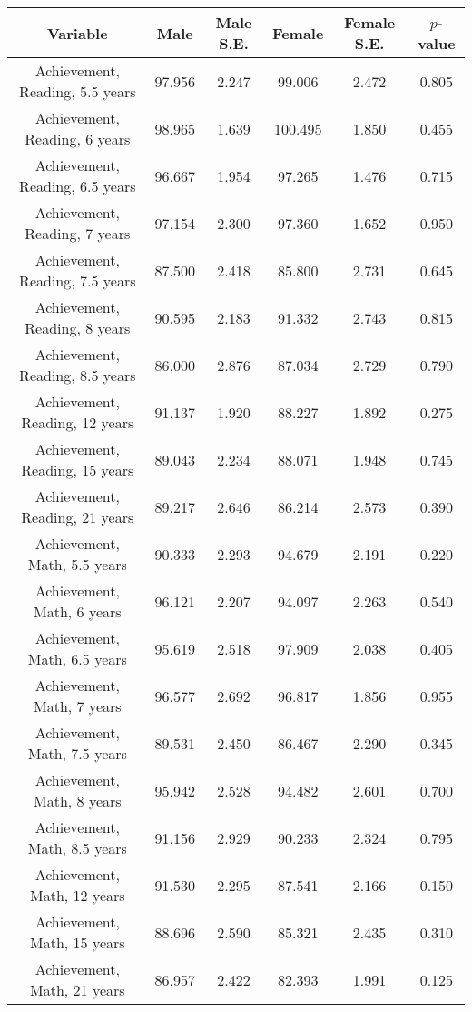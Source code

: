 \begin{longtable}{c c c c c c}
\toprule
\textbf{Variable} & \textbf{Male} & \textbf{Male S.E.}  & \textbf{Female} & \textbf{Female S.E.} & \textbf{$ p $-value} \\
\midrule
Achievement, Reading, 5.5 years & 97.956 & 2.247 &  99.006 & 2.472 & 0.805 \\
Achievement, Reading, 6 years & 98.965 & 1.639 &  100.495 & 1.850 & 0.455 \\
Achievement, Reading, 6.5 years & 96.667 & 1.954 &  97.265 & 1.476 & 0.715 \\
Achievement, Reading, 7 years & 97.154 & 2.300 &  97.360 & 1.652 & 0.950 \\
Achievement, Reading, 7.5 years & 87.500 & 2.418 &  85.800 & 2.731 & 0.645 \\
Achievement, Reading, 8 years & 90.595 & 2.183 &  91.332 & 2.743 & 0.815 \\
Achievement, Reading, 8.5 years & 86.000 & 2.876 &  87.034 & 2.729 & 0.790 \\
Achievement, Reading, 12 years & 91.137 & 1.920 &  88.227 & 1.892 & 0.275 \\
Achievement, Reading, 15 years & 89.043 & 2.234 &  88.071 & 1.948 & 0.745 \\
Achievement, Reading, 21 years & 89.217 & 2.646 &  86.214 & 2.573 & 0.390 \\
Achievement, Math, 5.5 years & 90.333 & 2.293 &  94.679 & 2.191 & 0.220 \\
Achievement, Math, 6 years & 96.121 & 2.207 &  94.097 & 2.263 & 0.540 \\
Achievement, Math, 6.5 years & 95.619 & 2.518 &  97.909 & 2.038 & 0.405 \\
Achievement, Math, 7 years & 96.577 & 2.692 &  96.817 & 1.856 & 0.955 \\
Achievement, Math, 7.5 years & 89.531 & 2.450 &  86.467 & 2.290 & 0.345 \\
Achievement, Math, 8 years & 95.942 & 2.528 &  94.482 & 2.601 & 0.700 \\
Achievement, Math, 8.5 years & 91.156 & 2.929 &  90.233 & 2.324 & 0.795 \\
Achievement, Math, 12 years & 91.530 & 2.295 &  87.541 & 2.166 & 0.150 \\
Achievement, Math, 15 years & 88.696 & 2.590 &  85.321 & 2.435 & 0.310 \\
Achievement, Math, 21 years & 86.957 & 2.422 &  82.393 & 1.991 & 0.125 \\
\bottomrule
\end{longtable}
